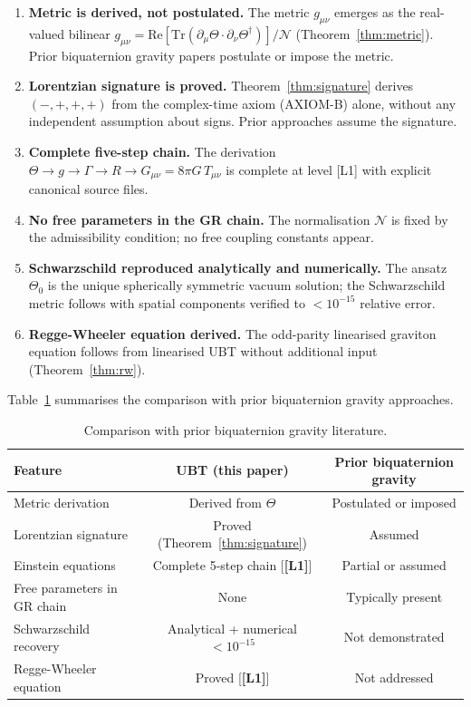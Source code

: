 \documentclass[12pt,a4paper]{article}
\theoremstyle{definition}
\theoremstyle{remark}
\newcommand{\Lone}{\textbf{[L1]}}
\newcommand{\Tr}{\mathrm{Tr}}
\newcommand{\re}{\mathrm{Re}}
\newcommand{\calN}{\mathcal{N}}
\begin{document}
\begin{enumerate}
  \item \textbf{Metric is derived, not postulated.}
        The metric $g_{\mu\nu}$ emerges as the real-valued bilinear
        $g_{\mu\nu} = \re[\Tr(\partial_\mu\Theta \cdot \partial_\nu\Theta^\dagger)]/\calN$
        (Theorem~\ref{thm:metric}).
        Prior biquaternion gravity papers postulate or impose the metric.

  \item \textbf{Lorentzian signature is proved.}
        Theorem~\ref{thm:signature} derives $(-,+,+,+)$ from the complex-time
        axiom (AXIOM-B) alone, without any independent assumption about signs.
        Prior approaches assume the signature.

  \item \textbf{Complete five-step chain.}
        The derivation $\Theta \to g \to \Gamma \to R \to G_{\mu\nu} = 8\pi G\,T_{\mu\nu}$
        is complete at level [L1] with explicit canonical source files.

  \item \textbf{No free parameters in the GR chain.}
        The normalisation $\calN$ is fixed by the admissibility condition;
        no free coupling constants appear.

  \item \textbf{Schwarzschild reproduced analytically and numerically.}
        The ansatz $\Theta_0$ is the unique spherically symmetric vacuum solution;
        the Schwarzschild metric follows with spatial components verified to
        $< 10^{-15}$ relative error.

  \item \textbf{Regge-Wheeler equation derived.}
        The odd-parity linearised graviton equation follows from linearised
        UBT without additional input (Theorem~\ref{thm:rw}).
\end{enumerate}

Table~\ref{tab:novelty} summarises the comparison with prior biquaternion
gravity approaches.

\begin{table}[ht]
\centering
\caption{Comparison with prior biquaternion gravity literature.}
\label{tab:novelty}
\begin{tabular}{lcc}
\toprule
\textbf{Feature} & \textbf{UBT (this paper)} & \textbf{Prior biquaternion gravity} \\
\midrule
Metric derivation & Derived from $\Theta$ & Postulated or imposed \\
Lorentzian signature & Proved (Theorem~\ref{thm:signature}) & Assumed \\
Einstein equations & Complete 5-step chain [\Lone] & Partial or assumed \\
Free parameters in GR chain & None & Typically present \\
Schwarzschild recovery & Analytical + numerical $<10^{-15}$ & Not demonstrated \\
Regge-Wheeler equation & Proved [\Lone] & Not addressed \\
\bottomrule
\end{tabular}
\end{table}
\end{document}
